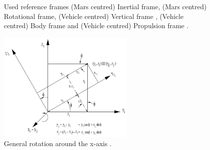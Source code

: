 \begin{figure}[H]



\caption{Used reference frames \protect{} (Mars centred) Inertial frame, \protect{} (Mars centred) Rotational frame, \protect{} (Vehicle centred) Vertical frame \citep{mooij2013fd}, \protect{} (Vehicle centred) Body frame \citep{trinidad2012} and \protect{} (Vehicle centred) Propulsion frame \citep{mooij1994motion}. } 
\label{fig:allFiveReferenceFrames_mooij2013fd-trinidad2012-mooij1994motion} 
\end{figure} 



\begin{figure}[H]
\centering
\includegraphics[width=0.6\textwidth]{figures/reference_frames/xtrans_mooij2013stat.jpg}
\caption{General rotation around the x-axis \citep{mooij2013stat}.}
\label{fig:exampleXtrans_mooij2013stat}
\end{figure}


